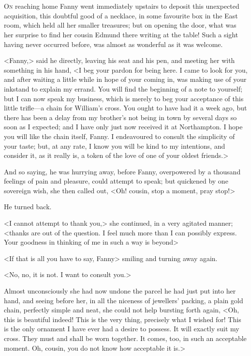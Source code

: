 \chapter[Chapter \thechapter]{} 

 \lettrine[lraise=0.3]{O}{n} reaching home Fanny went immediately upstairs to deposit this unexpected acquisition, this doubtful good of a necklace, in some favourite box in the East room, which held all her smaller treasures; but on opening the door, what was her surprise to find her cousin Edmund there writing at the table! Such a sight having never occurred before, was almost as wonderful as it was welcome.

<Fanny,> said he directly, leaving his seat and his pen, and meeting her with something in his hand, <I beg your pardon for being here. I came to look for you, and after waiting a little while in hope of your coming in, was making use of your inkstand to explain my errand. You will find the beginning of a note to yourself; but I can now speak my business, which is merely to beg your acceptance of this little trifle—a chain for William's cross. You ought to have had it a week ago, but there has been a delay from my brother's not being in town by several days so soon as I expected; and I have only just now received it at Northampton. I hope you will like the chain itself, Fanny. I endeavoured to consult the simplicity of your taste; but, at any rate, I know you will be kind to my intentions, and consider it, as it really is, a token of the love of one of your oldest friends.>

And so saying, he was hurrying away, before Fanny, overpowered by a thousand feelings of pain and pleasure, could attempt to speak; but quickened by one sovereign wish, she then called out, <Oh! cousin, stop a moment, pray stop!>

He turned back.

<I cannot attempt to thank you,> she continued, in a very agitated manner; <thanks are out of the question. I feel much more than I can possibly express. Your goodness in thinking of me in such a way is beyond\longdash>

<If that is all you have to say, Fanny> smiling and turning away again.

<No, no, it is not. I want to consult you.>

Almost unconsciously she had now undone the parcel he had just put into her hand, and seeing before her, in all the niceness of jewellers' packing, a plain gold chain, perfectly simple and neat, she could not help bursting forth again, <Oh, this is beautiful indeed! This is the very thing, precisely what I wished for! This is the only ornament I have ever had a desire to possess. It will exactly suit my cross. They must and shall be worn together. It comes, too, in such an acceptable moment. Oh, cousin, you do not know how acceptable it is.>

